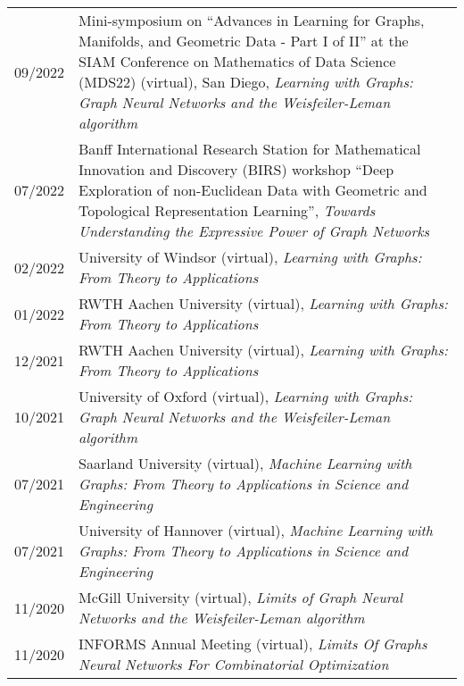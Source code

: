 \documentclass[11pt, a4paper, DIV=14, headings=small]{scrartcl}
\begin{document}
\begin{longtabu}{p{2.1cm}p{12.0cm}}
		09/2022 & Mini-symposium on ``Advances in Learning for Graphs, Manifolds, and Geometric Data - Part I of II'' at the SIAM Conference on Mathematics of Data Science (MDS22) (virtual), San Diego, \emph{Learning with Graphs: Graph Neural Networks and the Weisfeiler-Leman algorithm} \\
		07/2022 & Banff International Research Station for Mathematical Innovation and Discovery (BIRS) workshop ``Deep Exploration of non-Euclidean Data with Geometric and Topological Representation Learning'',  \emph{Towards Understanding the Expressive Power of Graph Networks}        \\
		02/2022 & University of Windsor (virtual), \emph{Learning with Graphs: From Theory to Applications}                                                                                                                                                                                     \\
		01/2022 & RWTH Aachen University (virtual), \emph{Learning with Graphs: From Theory to Applications}                                                                                                                                                                                    \\
		12/2021 & RWTH Aachen University (virtual), \emph{Learning with Graphs: From Theory to Applications}                                                                                                                                                                                    \\
		10/2021 & University of Oxford (virtual), \emph{Learning with Graphs: Graph Neural Networks and the Weisfeiler-Leman algorithm}                                                                                                                                                         \\
		07/2021 & Saarland University (virtual), \emph{Machine Learning with Graphs: From Theory to Applications in Science and Engineering} \\
		07/2021 & University of Hannover (virtual), \emph{Machine Learning with Graphs:
			From Theory to Applications in Science and Engineering}                                                                              \\
		11/2020 & McGill University (virtual), \emph{Limits of Graph Neural Networks and the Weisfeiler-Leman algorithm}                     \\
		11/2020 & INFORMS Annual Meeting (virtual), \emph{Limits Of Graphs Neural Networks For Combinatorial Optimization}                   \\

\end{longtabu}
\end{document}
